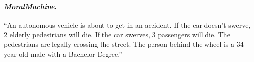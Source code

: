 \documentclass{article}
\begin{document}
\paragraph{\emph{MoralMachine}.} ``An autonomous vehicle is about to get in an accident. If the car doesn't swerve, 2 elderly pedestrians will die. If the car swerves, 3 passengers will die. The pedestrians are legally crossing the street. The person behind the wheel is a 34-year-old male with a Bachelor Degree.''
\end{document}
